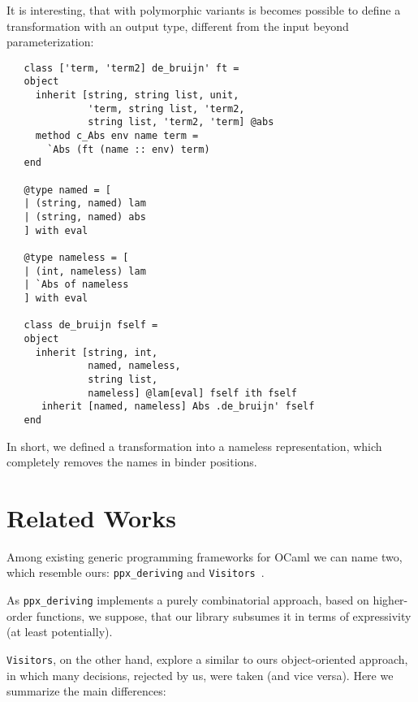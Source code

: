 \documentclass[twocolumn,8pt]{extarticle}
\newcommand{\cd}[1]{\texttt{#1}}
\begin{document}
It is interesting, that with polymorphic variants is becomes possible to define a transformation with an output type, different from the input
beyond parameterization:

\begin{lstlisting}
   class ['term, 'term2] de_bruijn' ft =
   object
     inherit [string, string list, unit,
              'term, string list, 'term2,
              string list, 'term2, 'term] @abs
     method c_Abs env name term =
       `Abs (ft (name :: env) term) 
   end
     
   @type named = [
   | (string, named) lam
   | (string, named) abs
   ] with eval
                     
   @type nameless = [
   | (int, nameless) lam
   | `Abs of nameless
   ] with eval

   class de_bruijn fself =
   object
     inherit [string, int,
              named, nameless,
              string list,
              nameless] @lam[eval] fself ith fself
      inherit [named, nameless] Abs .de_bruijn' fself 
   end
\end{lstlisting}

In short, we defined a transformation into a nameless representation, which completely removes the names in binder
positions.

\section{Related Works}

Among existing generic programming frameworks for OCaml we can name two, which resemble ours: \cd{ppx\_deriving} and \cd{Visitors}~\cite{Visitors}.

As \cd{ppx\_deriving} implements a purely combinatorial approach, based on higher-order functions, we suppose, that our library subsumes it in terms
of expressivity (at least potentially).

\cd{Visitors}, on the other hand, explore a similar to ours object-oriented approach, in which many decisions, rejected by us, were taken (and vice versa). Here
we summarize the main differences:
\end{document}

